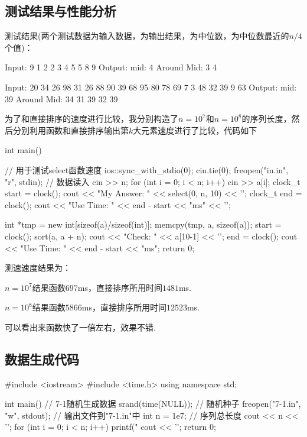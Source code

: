 \documentclass[12pt, a4paper, oneside]{ctexart}
\numberwithin{equation}{section}  %
\begin{document}
\subsection{测试结果与性能分析}
测试结果(两个测试数据为输入数据，为输出结果，为中位数，为中位数最近的$n/4$个值)：
\begin{cppcode}
Input:
9
1 2 2 3 4 5 5 8 9
Output:
mid: 4
Around Mid: 3 4

Input:
20
34 26 98 31 26 88 90 39 68 95 80 78 69 7 3 48 32 39 9 63 
Output:
mid: 39
Around Mid: 34 31 39 32 39
\end{cppcode}
为了和直接排序的速度进行比较，我分别构造了$n=10^7$和$n=10^8$的序列长度，然后分别利用函数和直接排序输出第$k$大元素速度进行了比较，代码如下
\begin{cppcode}
int main() {  // 用于测试select函数速度
    ios::sync_with_stdio(0);
    cin.tie(0);
    freopen("in.in", "r", stdin);  // 数据读入
    cin >> n;
    for (int i = 0; i < n; i++) cin >> a[i];
    clock_t start = clock();
    cout << "My Answer: " << select(0, n, 10) << '\n';
    clock_t end = clock();
    cout << "Use Time: " << end - start << "ms" << '\n';
    
    int *tmp = new int[sizeof(a)/sizeof(int)];
    memcpy(tmp, a, sizeof(a));
    start = clock();
    sort(a, a + n);
    cout << "Check: " << a[10-1] << '\n';
    end = clock();
    cout << "Use Time: " << end - start << "ms";
    return 0;
}
\end{cppcode}
测速速度结果为：

$n=10^7$结果函数$697$ms，直接排序所用时间$1481$ms.

$n=10^8$结果函数$5866$ms，直接排序所用时间$12523$ms.

可以看出来函数快了一倍左右，效果不错.
\subsection{数据生成代码}
\begin{cppcode}
#include <iostream>
#include <time.h>
using namespace std;

int main() {  // 7-1随机生成数据
    srand(time(NULL));  // 随机种子
    freopen("7-1.in", "w", stdout);  // 输出文件到"7-1.in"中
    int n = 1e7;  // 序列总长度
    cout << n << '\n';
    for (int i = 0; i < n; i++) {
        printf("%
    }
    cout << '\n';
    return 0;
} 
\end{cppcode}
\clearpage
\end{document}
